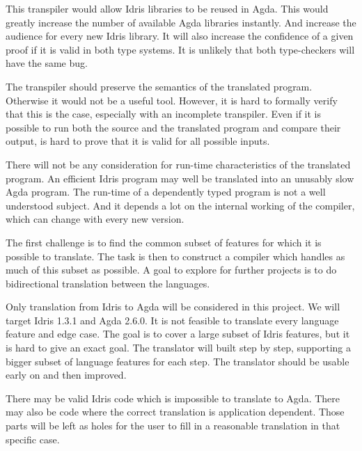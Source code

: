 \documentclass[parskip=half]{scrartcl}
\begin{document}
This transpiler would allow Idris libraries to be reused in Agda. This would
greatly increase the number of available Agda libraries instantly. And increase
the audience for every new Idris library.  It will also increase the confidence
of a given proof if it is valid in both type systems. It is unlikely that both
type-checkers will have the same bug.

The transpiler should preserve the semantics of the translated program.
Otherwise it would not be a useful tool. However, it is hard to formally verify
that this is the case, especially with an incomplete transpiler. Even if it is
possible to run both the source and the translated program and compare their
output, is hard to prove that it is valid for all possible inputs.

There will not be any consideration for run-time characteristics of the
translated program. An efficient Idris program may well be translated into an
unusably slow Agda program. The run-time of a dependently typed program is not
a well understood subject. And it depends a lot on the internal working of the
compiler, which can change with every new version.


The first challenge is to find the common subset of features for which it is
possible to translate. The task is then to construct a compiler which handles
as much of this subset as possible.
A goal to explore for further projects is to do bidirectional translation
between the languages.


Only translation from Idris to Agda will be considered in this project. We will
target Idris 1.3.1 and Agda 2.6.0. It is not feasible to translate every
language feature and edge case.  The goal is to cover a large subset of Idris
features, but it is hard to give an exact goal.  The translator will built step
by step, supporting a bigger subset of language features for each step. The
translator should be usable early on and then improved.

There may be valid Idris code which is impossible to translate to Agda. There
may also be code where the correct translation is application dependent. Those
parts will be left as holes for the user to fill in a reasonable translation in
that specific case.
\end{document}
